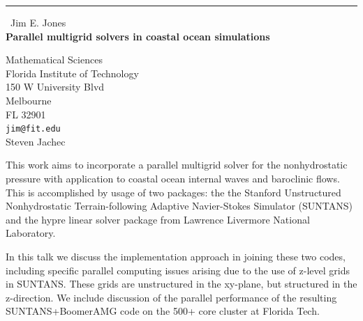 \documentclass{report}
\begin{document}
\begin{center}
\rule{6in}{1pt} \
{\large Jim E. Jones \\
{\bf Parallel multigrid solvers in coastal ocean simulations}}

Mathematical Sciences \\ Florida Institute of Technology \\ 150 W University Blvd \\ Melbourne \\ FL 32901
\\
{\tt jim@fit.edu}\\
Steven Jachec\end{center}



This work aims to incorporate a parallel multigrid solver for the
nonhydrostatic pressure with application to coastal ocean internal waves
and baroclinic flows. This is accomplished by usage of two packages: the
the Stanford Unstructured Nonhydrostatic Terrain-following Adaptive
Navier-Stokes Simulator (SUNTANS) and the hypre linear solver package
from Lawrence Livermore National Laboratory.

In this talk we discuss the implementation approach in joining these two
codes, including specific parallel computing issues arising due to the
use of z-level grids in SUNTANS. These grids are unstructured in the
xy-plane, but structured in the z-direction. We include discussion of the
parallel performance of the resulting SUNTANS+BoomerAMG code on the 500+
core cluster at Florida Tech.
\end{document}

